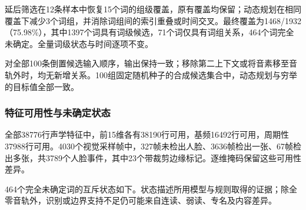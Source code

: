 延后筛选在12条样本中恢复15个词的组级覆盖，原有覆盖均保留；动态规划在相同覆盖下减少3个词组，并消除词组间的索引重叠或时间交叉。最终覆盖为1468/1932（75.98\%），其中1397个词具有词级候选，71个词仅具有词组关系，464个词完全未确定。全量词级状态与时间逐项不变。

对全部100条倒置候选输入顺序，输出保持一致；移除第二上下文或将音素移至音轨外时，均无新增关系。100组固定随机种子的合成候选集合中，动态规划与穷举的目标值全部一致。

\hypertarget{q1-ux7279ux5f81ux53efux7528ux6027ux4e0eux672aux786eux5b9aux72b6ux6001}{%
\subsubsection{特征可用性与未确定状态}\label{q1-ux7279ux5f81ux53efux7528ux6027ux4e0eux672aux786eux5b9aux72b6ux6001}}

全部38776行声学特征中，前15维各有38190行可用，基频16492行可用，周期性37988行可用。4030个视觉采样帧中，327帧未检出人脸、3636帧检出一张、67帧检出多张，共3789个人脸事件，其中23个带裁剪边缘标记。逐维掩码保留这些可用性差异。

464个完全未确定词的互斥状态如下。状态描述所用模型与规则取得的证据；除全零音轨外，识别或边界支持不足仍可能来自连读、弱读、专名及内容差异。

